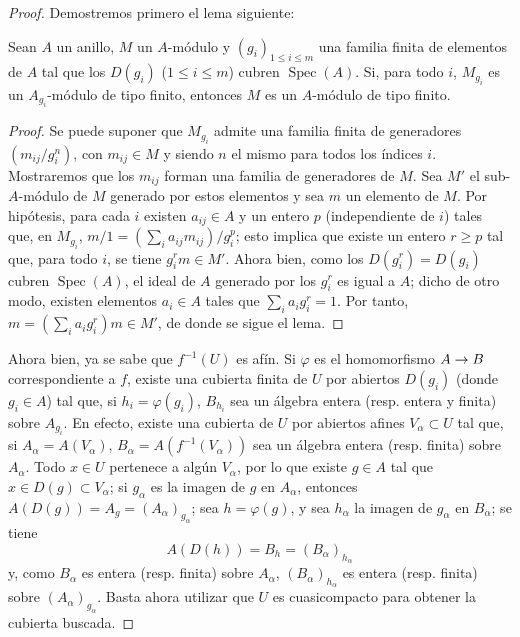 \documentclass[oneside,10pt]{amsart}
\makeatletter
\renewcommand{\leq}{\leqslant}
\renewcommand{\geq}{\geqslant}
\newcommand{\ega@arrow}[2]{\mathchoice{#1}{#2}{#2}{#2}}
\renewcommand{\to}{\ega@arrow{\longrightarrow}{\rightarrow}}
\newcommand{\oldpage}[2][]{\marginnote{\normalfont\footnotesize\textbf{#1}~|~#2}\ignorespaces}
\let\EGAOriginalLabel\label
\renewcommand{\label}[1]{\phantomsection\EGAOriginalLabel{#1}}
\makeatother
\begin{document}
\oldpage[II]{111}
\begin{proof}
Demostremos primero el lema siguiente:

  \begin{lemma}[6.1.4.1]
  \label{II.6.1.4.1-fr}
  Sean $A$ un anillo, $M$ un $A$-módulo y $(g_i)_{1\leq i\leq m}$ una familia finita de elementos de $A$ tal que los $D(g_i)$ ($1\leq i\leq m$) cubren $\operatorname{Spec}(A)$.
  Si, para todo $i$, $M_{g_i}$ es un $A_{g_i}$-módulo de tipo finito, entonces $M$ es un $A$-módulo de tipo finito.
  \end{lemma}

  \begin{proof}
  Se puede suponer que $M_{g_i}$ admite una familia finita de generadores $(m_{ij}/g_i^n)$, con $m_{ij}\in M$ y siendo $n$ el mismo para todos los índices $i$.
  Mostraremos que los $m_{ij}$ forman una familia de generadores de $M$.
  Sea $M'$ el sub-$A$-módulo de $M$ generado por estos elementos y sea $m$ un elemento de $M$.
  Por hipótesis, para cada $i$ existen $a_{ij}\in A$ y un entero $p$ (independiente de $i$) tales que, en $M_{g_i}$, $m/1=(\sum_i a_{ij}m_{ij})/g_i^p$;
  esto implica que existe un entero $r\geq p$ tal que, para todo $i$, se tiene $g_i^r m\in M'$.
  Ahora bien, como los $D(g_i^r)=D(g_i)$ cubren $\operatorname{Spec}(A)$, el ideal de $A$ generado por los $g_i^r$ es igual a $A$; dicho de otro modo, existen elementos $a_i\in A$ tales que $\sum_i a_i g_i^r=1$.
  Por tanto, $m=(\sum_i a_i g_i^r)m\in M'$, de donde se sigue el lema.
  \end{proof}

Ahora bien, ya se sabe  que $f^{-1}(U)$ es afín.
Si $\varphi$ es el homomorfismo $A\to B$ correspondiente a $f$, existe una cubierta finita de $U$ por abiertos $D(g_i)$ (donde $g_i\in A$) tal que, si $h_i=\varphi(g_i)$, $B_{h_i}$ sea un álgebra entera (resp. entera y finita) sobre $A_{g_i}$.
En efecto, existe una cubierta de $U$ por abiertos afines $V_\alpha\subset U$ tal que, si $A_\alpha=A(V_\alpha)$, $B_\alpha=A(f^{-1}(V_\alpha))$ sea un álgebra entera (resp. finita) sobre $A_\alpha$.
Todo $x\in U$ pertenece a algún $V_\alpha$, por lo que existe $g\in A$ tal que $x\in D(g)\subset V_\alpha$;
si $g_\alpha$ es la imagen de $g$ en $A_\alpha$, entonces $A(D(g))=A_g=(A_\alpha)_{g_\alpha}$;
sea $h=\varphi(g)$, y sea $h_\alpha$ la imagen de $g_\alpha$ en $B_\alpha$;
se tiene
\[
A(D(h))=B_h=(B_\alpha)_{h_\alpha}
\]
y, como $B_\alpha$ es entera (resp. finita) sobre $A_\alpha$, $(B_\alpha)_{h_\alpha}$ es entera (resp. finita) sobre $(A_\alpha)_{g_\alpha}$.
Basta ahora utilizar que $U$ es cuasicompacto para obtener la cubierta buscada.


\end{proof}
\end{document}
